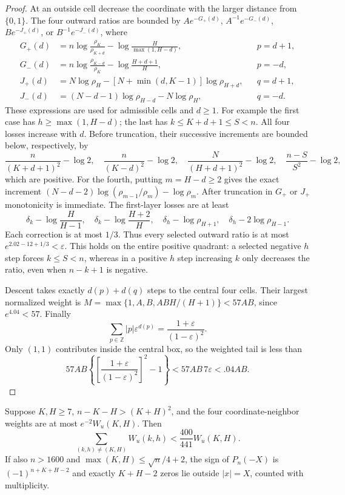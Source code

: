 \begin{proof}
At an outside cell decrease the coordinate with the larger distance
from $\{0,1\}$. The four outward ratios are bounded by
$Ae^{-G_+(d)}$, $A^{-1}e^{-G_-(d)}$, $Be^{-J_+(d)}$, or
$B^{-1}e^{-J_-(d)}$, where
\begin{align*}
G_+(d)&=n\log\frac{\rho_K}{\rho_{K+d}}
             -\log\frac{H}{\max(1,H-d)},&&p=d+1,\\
G_-(d)&=n\log\frac{\rho_{K-d}}{\rho_K}
             -\log\frac{H+d+1}{H},&&p=-d,\\
J_+(d)&=N\log\rho_H-[N+\min(d,K-1)]\log\rho_{H+d},&&q=d+1,\\
J_-(d)&=(N-d-1)\log\rho_{H-d}-N\log\rho_H,&&q=-d.
\end{align*}
These expressions are used for admissible cells and $d\ge1$.
For example the first case has $h\ge\max(1,H-d)$; the last has
$k\le K+d+1\le S<n$.
All four losses increase with $d$. Before truncation, their successive
increments are bounded below, respectively, by
\[
 \frac{n}{(K+d+1)^2}-\log2,\quad
 \frac{n}{(K-d)^2}-\log2,\quad
 \frac{N}{(H+d+1)^2}-\log2,\quad
 \frac{n-S}{S^2}-\log2,
\]
which are positive. For the fourth, putting $m=H-d\ge2$ gives the
exact increment
$(N-d-2)\log(\rho_{m-1}/\rho_m)-\log\rho_m$.
After truncation in $G_+$ or $J_+$ monotonicity is immediate.
The first-layer losses are at least
\[
 \delta_k-\log\frac H{H-1},\quad
 \delta_k-\log\frac{H+2}H,\quad
 \delta_h-\log\rho_{H+1},\quad
 \delta_h-2\log\rho_{H-1}.
\]
Each correction is at most $1/3$. Thus every selected outward ratio
is at most $e^{2.02-12+1/3}<\varepsilon$.
This holds on the entire positive quadrant: a selected negative
$h$ step forces $k\le S<n$, whereas in a positive $h$ step increasing
$k$ only decreases the ratio, even when $n-k+1$ is negative.

Descent takes exactly $d(p)+d(q)$ steps to the central four cells.
Their largest normalized weight is
$M=\max\{1,A,B,ABH/(H+1)\}<57AB$, since $e^{4.04}<57$.
Finally
\[
 \sum_{p\in\mathbb Z}|p|\varepsilon^{d(p)}
 =\frac{1+\varepsilon}{(1-\varepsilon)^2}.
\]
Only $(1,1)$ contributes inside the central box, so the weighted tail is
less than
\[
 57AB\left\{\left[\frac{1+\varepsilon}{(1-\varepsilon)^2}\right]^2-1\right\}
 <57AB\,7\varepsilon<.04AB.
\]
\end{proof}

\begin{lemma}\label{lem:bridge-vertex}
Suppose $K,H\ge7$, $n-K-H>(K+H)^2$, and the four coordinate-neighbor
weights are at most $e^{-2}W_u(K,H)$. Then
\[
 \sum_{(k,h)\ne(K,H)}W_u(k,h)<\frac{400}{441}W_u(K,H).
\]
If also $n>1600$ and $\max(K,H)\le\sqrt n/4+2$, the sign of
$P_n(-X)$ is $(-1)^{n+K+H-2}$ and exactly $K+H-2$ zeros lie outside
$|x|=X$, counted with multiplicity.
\end{lemma}


